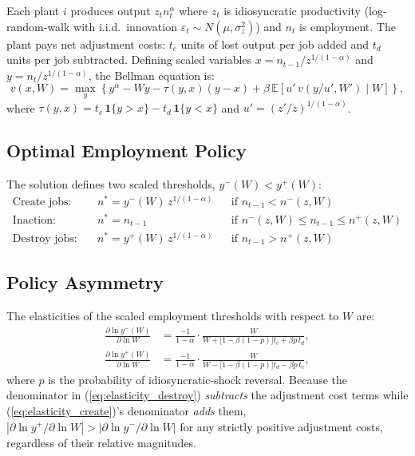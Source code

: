 Each plant $i$ produces output $z_t n_t^\alpha$ where $z_t$ is idiosyncratic
productivity (log-random-walk with i.i.d.\ innovation
$\varepsilon_t\sim N(\mu,\sigma_z^2)$) and $n_t$ is employment. The plant
pays net adjustment costs: $t_c$ units of lost output per job added and
$t_d$ units per job subtracted. Defining scaled variables
$x = n_{t-1}/z^{1/(1-\alpha)}$ and $y = n_t/z^{1/(1-\alpha)}$, the Bellman
equation is:
\begin{equation}
  v(x,W) = \max_y\!\left\{
    y^\alpha - Wy - \tau(y,x)(y-x)
    + \beta\,\mathbb{E}\!\left[u'\,v(y/u',W')\mid W\right]
  \right\},
  \label{eq:cf_bellman}
\end{equation}
where $\tau(y,x) = t_c\,\mathbf{1}\{y>x\} - t_d\,\mathbf{1}\{y<x\}$ and
$u' = (z'/z)^{1/(1-\alpha)}$.

\subsection*{Optimal Employment Policy}

The solution defines two scaled thresholds, $y^-(W) < y^+(W)$:
\begin{align}
  \text{Create jobs:} &\quad n^* = y^-(W)\,z^{1/(1-\alpha)}
    &&\text{if } n_{t-1} < n^-(z,W) \\
  \text{Inaction:}    &\quad n^* = n_{t-1}
    &&\text{if } n^-(z,W)\leq n_{t-1}\leq n^+(z,W) \\
  \text{Destroy jobs:}&\quad n^* = y^+(W)\,z^{1/(1-\alpha)}
    &&\text{if } n_{t-1} > n^+(z,W)
\end{align}

\subsection*{Policy Asymmetry}

The elasticities of the scaled employment thresholds with respect to $W$ are:
\begin{align}
  \frac{\partial \ln y^-(W)}{\partial \ln W} &=
    \frac{-1}{1-\alpha}\cdot
    \frac{W}{W + \bigl[1-\beta(1-p)\bigr]t_c + \beta p\,t_d},
  \label{eq:elasticity_create} \\[6pt]
  \frac{\partial \ln y^+(W)}{\partial \ln W} &=
    \frac{-1}{1-\alpha}\cdot
    \frac{W}{W - \bigl[1-\beta(1-p)\bigr]t_d - \beta p\,t_c},
  \label{eq:elasticity_destroy}
\end{align}
where $p$ is the probability of idiosyncratic-shock reversal. Because the
denominator in (\ref{eq:elasticity_destroy}) \emph{subtracts} the adjustment
cost terms while (\ref{eq:elasticity_create})'s denominator \emph{adds} them,
$\left|\partial\ln y^+/\partial\ln W\right| > \left|\partial\ln y^-/\partial\ln
W\right|$ for any strictly positive adjustment costs, regardless of their
relative magnitudes.

